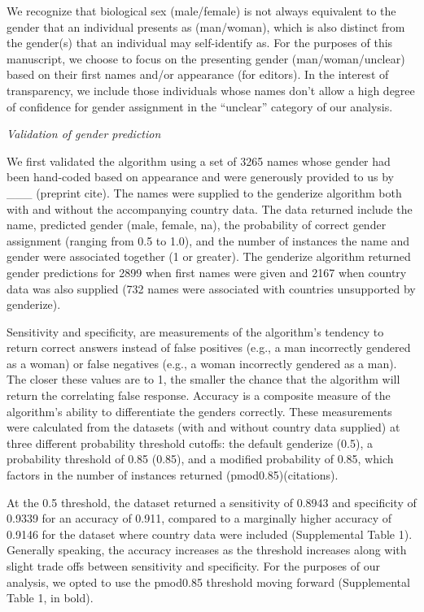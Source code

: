 \documentclass[11pt,]{article}
\begin{document}
We recognize that biological sex (male/female) is not always equivalent
to the gender that an individual presents as (man/woman), which is also
distinct from the gender(s) that an individual may self-identify as. For
the purposes of this manuscript, we choose to focus on the presenting
gender (man/woman/unclear) based on their first names and/or appearance
(for editors). In the interest of transparency, we include those
individuals whose names don't allow a high degree of confidence for
gender assignment in the ``unclear'' category of our analysis.

\emph{Validation of gender prediction}

We first validated the algorithm using a set of 3265 names whose gender
had been hand-coded based on appearance and were generously provided to
us by \_\_\_ (preprint cite). The names were supplied to the genderize
algorithm both with and without the accompanying country data. The data
returned include the name, predicted gender (male, female, na), the
probability of correct gender assignment (ranging from 0.5 to 1.0), and
the number of instances the name and gender were associated together (1
or greater). The genderize algorithm returned gender predictions for
2899 when first names were given and 2167 when country data was also
supplied (732 names were associated with countries unsupported by
genderize).

Sensitivity and specificity, are measurements of the algorithm's
tendency to return correct answers instead of false positives (e.g., a
man incorrectly gendered as a woman) or false negatives (e.g., a woman
incorrectly gendered as a man). The closer these values are to 1, the
smaller the chance that the algorithm will return the correlating false
response. Accuracy is a composite measure of the algorithm's ability to
differentiate the genders correctly. These measurements were calculated
from the datasets (with and without country data supplied) at three
different probability threshold cutoffs: the default genderize (0.5), a
probability threshold of 0.85 (0.85), and a modified probability of
0.85, which factors in the number of instances returned
(pmod0.85)(citations).

At the 0.5 threshold, the dataset returned a sensitivity of 0.8943 and
specificity of 0.9339 for an accuracy of 0.911, compared to a marginally
higher accuracy of 0.9146 for the dataset where country data were
included (Supplemental Table 1). Generally speaking, the accuracy
increases as the threshold increases along with slight trade offs
between sensitivity and specificity. For the purposes of our analysis,
we opted to use the pmod0.85 threshold moving forward (Supplemental
Table 1, in bold).
\end{document}
